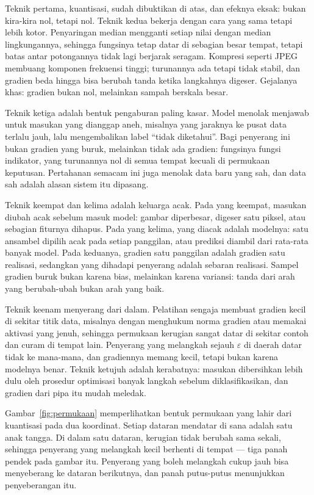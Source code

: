Teknik pertama, kuantisasi, sudah dibuktikan di atas, dan efeknya eksak: bukan
kira-kira nol, tetapi nol. Teknik kedua bekerja dengan cara yang sama tetapi lebih
kotor. Penyaringan median mengganti setiap nilai dengan median lingkungannya, sehingga
fungsinya tetap datar di sebagian besar tempat, tetapi batas antar potongannya tidak lagi
berjarak seragam. Kompresi seperti JPEG membuang komponen frekuensi tinggi; turunannya
ada tetapi tidak stabil, dan gradien beda hingga bisa berubah tanda ketika langkahnya
digeser. Gejalanya khas: gradien bukan nol, melainkan sampah berskala besar.

Teknik ketiga adalah bentuk pengaburan paling kasar. Model menolak menjawab untuk masukan
yang dianggap aneh, misalnya yang jaraknya ke pusat data terlalu jauh, lalu mengembalikan
label ``tidak diketahui''. Bagi penyerang ini bukan gradien yang buruk, melainkan tidak
ada gradien: fungsinya fungsi indikator, yang turunannya nol di semua tempat kecuali di
permukaan keputusan. Pertahanan semacam ini juga menolak data baru yang sah, dan data sah
adalah alasan sistem itu dipasang.

Teknik keempat dan kelima adalah keluarga acak. Pada yang keempat, masukan diubah acak
sebelum masuk model: gambar diperbesar, digeser satu piksel, atau sebagian fiturnya
dihapus. Pada yang kelima, yang diacak adalah modelnya: satu ansambel dipilih acak pada
setiap panggilan, atau prediksi diambil dari rata-rata banyak model. Pada keduanya,
gradien satu panggilan adalah gradien satu realisasi, sedangkan yang dihadapi penyerang
adalah sebaran realisasi. Sampel gradien buruk bukan karena bias, melainkan karena
variansi: tanda dari arah yang berubah-ubah bukan arah yang baik.

Teknik keenam menyerang dari dalam. Pelatihan sengaja membuat
gradien kecil di sekitar titik data, misalnya dengan menghukum norma gradien atau
memakai aktivasi yang jenuh, sehingga permukaan kerugian sangat datar di sekitar contoh
dan curam di tempat lain. Penyerang yang melangkah sejauh $\varepsilon$ di daerah datar
tidak ke mana-mana, dan gradiennya memang kecil, tetapi bukan karena modelnya benar.
Teknik ketujuh adalah kerabatnya: masukan dibersihkan lebih dulu oleh prosedur
optimisasi banyak langkah sebelum diklasifikasikan, dan gradien dari pipa itu mudah
meledak.

Gambar~\ref{fig:permukaan} memperlihatkan bentuk permukaan yang lahir dari kuantisasi
pada dua koordinat. Setiap dataran mendatar di sana adalah satu anak tangga. Di dalam
satu dataran, kerugian tidak berubah sama sekali, sehingga penyerang yang melangkah
kecil berhenti di tempat --- tiga panah pendek pada gambar itu. Penyerang yang boleh
melangkah cukup jauh bisa menyeberang ke dataran berikutnya, dan panah putus-putus
menunjukkan penyeberangan itu.

